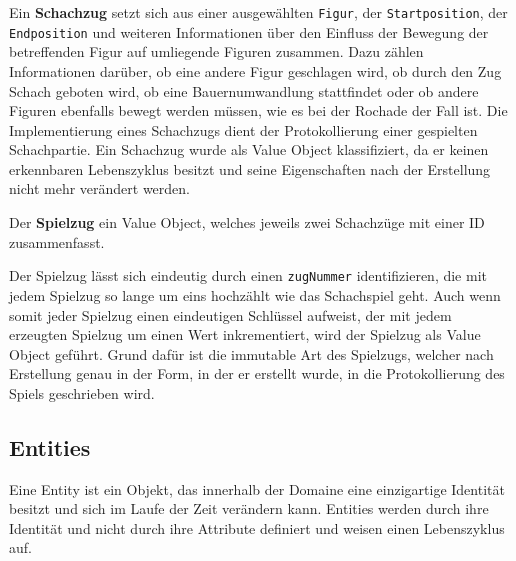 Ein \textbf{Schachzug} setzt sich aus einer ausgewählten \texttt{Figur}, der \texttt{Startposition}, der \texttt{Endposition} und weiteren Informationen über den Einfluss der Bewegung der betreffenden Figur auf umliegende Figuren zusammen. 
Dazu zählen Informationen darüber, ob eine andere Figur geschlagen wird, ob durch den Zug Schach geboten wird, ob eine Bauernumwandlung stattfindet oder ob andere Figuren ebenfalls bewegt werden müssen, wie es bei der Rochade der Fall ist. 
Die Implementierung eines Schachzugs dient der Protokollierung einer gespielten Schachpartie. 
Ein Schachzug wurde als Value Object klassifiziert, da er keinen erkennbaren Lebenszyklus besitzt und seine Eigenschaften nach der Erstellung nicht mehr verändert werden.

Der \textbf{Spielzug} ein Value Object, welches jeweils zwei Schachzüge mit einer ID zusammenfasst. 

Der Spielzug lässt sich eindeutig durch einen \texttt{zugNummer} identifizieren, die mit jedem Spielzug so lange um eins hochzählt wie das Schachspiel geht. 
Auch wenn somit jeder Spielzug einen eindeutigen Schlüssel aufweist, der mit jedem erzeugten Spielzug um einen Wert inkrementiert, wird der Spielzug als Value Object geführt. 
Grund dafür ist die immutable Art des Spielzugs, welcher nach Erstellung genau in der Form, in der er erstellt wurde, in die Protokollierung des Spiels geschrieben wird. 

\newpage

\subsection*{Entities}

Eine Entity ist ein Objekt, das innerhalb der Domaine eine einzigartige Identität besitzt und sich im Laufe der Zeit verändern kann. 
Entities werden durch ihre Identität und nicht durch ihre Attribute definiert und weisen einen Lebenszyklus auf.

